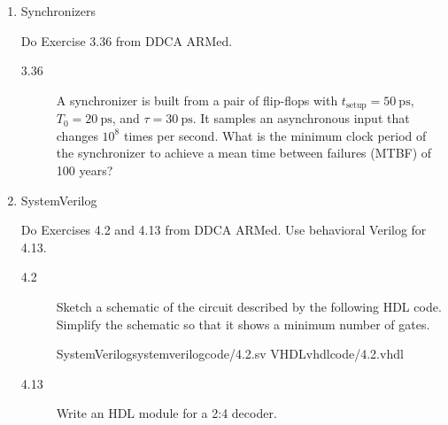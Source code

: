 \documentclass{e85}
\begin{document}
\begin{enumerate}
\begin{center}
  \end{center}
  \begin{solution}
  \end{solution}

\item Synchronizers

  Do Exercise 3.36 from DDCA ARMed.
  \begin{description}
  \item[3.36] A synchronizer is built from a pair of flip-flops with
    \(t_\text{setup} = \SI{50}{\ps}\), \(T_0 = \SI{20}{\ps}\), and
    \(\tau = \SI{30}{\ps}\).  It samples an asynchronous input that
    changes \(10^8\) times per second.  What is the minimum clock
    period of the synchronizer to achieve a mean time between failures
    (MTBF) of 100 years?
  \end{description}
  \begin{solution}
  \end{solution}

\item SystemVerilog

  Do Exercises 4.2 and 4.13 from DDCA ARMed.  Use behavioral Verilog
  for 4.13.
  \begin{description}
  \item[4.2] Sketch a schematic of the circuit described by the
    following HDL code.  Simplify the schematic so that it shows a
    minimum number of gates.
    \begin{center}
      \twocolumnlisting
      {SystemVerilog}{systemverilog}{code/4.2.sv}
      {VHDL}{vhdl}{code/4.2.vhdl}
    \end{center}
    \begin{solution}
    \end{solution}
  \item[4.13] Write an HDL module for a 2:4 decoder.
    \begin{solution}
    \end{solution}
  \end{description}


\end{enumerate}
\end{document}
